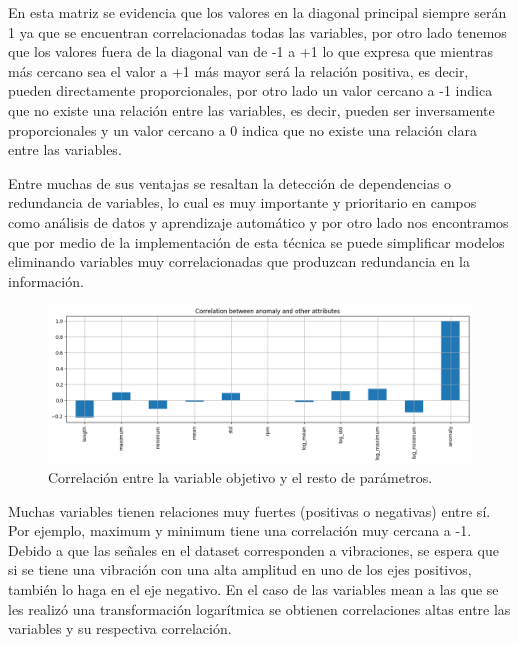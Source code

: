 \documentclass[11pt,a4paper,spanish]{book}
\numberwithin{equation}{chapter}
\numberwithin{figure}{chapter}
\begin{document}
En esta matriz se evidencia que los valores en la diagonal principal siempre serán 1 ya que se encuentran correlacionadas todas las variables, por otro lado tenemos que los valores fuera de la diagonal van de -1 a +1 lo que expresa que mientras más cercano sea el valor a +1 más mayor será la relación positiva, es decir, pueden directamente proporcionales, por otro lado un valor cercano a -1 indica que no existe una relación entre las variables, es decir, pueden ser inversamente proporcionales y un valor cercano a 0 indica que no existe una relación clara entre las variables. \cite{Alvarez2023}


Entre muchas de sus ventajas se resaltan la detección de dependencias o redundancia de variables, lo cual es muy importante y prioritario en campos como análisis de datos y aprendizaje automático y por otro lado nos encontramos que por medio de la implementación de esta técnica se puede simplificar modelos eliminando variables muy correlacionadas que produzcan redundancia en la información. \cite{Alvarez2023}



\begin{figure}[h]
    \centering
    \includegraphics[width=1\textwidth]{media/dataset/corr-mat-target.png}
    \caption{Correlación entre la variable objetivo y el resto de parámetros.}
    \label{fig:figCorrMatTarget}
\end{figure}



Muchas variables tienen relaciones muy fuertes (positivas o negativas) entre sí. Por ejemplo,  maximum y minimum tiene una correlación muy cercana a -1. Debido a que las señales en el dataset corresponden a vibraciones, se espera que si se tiene una vibración con una alta amplitud en uno de los ejes positivos, también lo haga en el eje negativo. En el caso de las variables mean a las que se les realizó una transformación logarítmica se obtienen correlaciones altas entre las variables y su respectiva correlación. 
\end{document}
